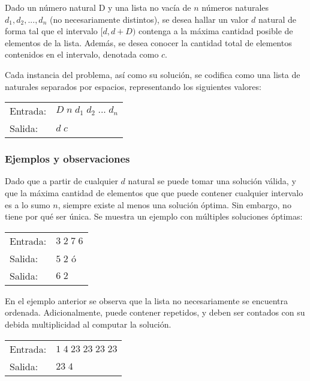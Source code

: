 Dado un número natural D y una lista no vacía de $n$ números naturales $d_1, d_2, ..., d_n$ (no necesariamente distintos), se desea hallar un valor $d$ natural de forma tal que el intervalo $[d, d + D)$ contenga a la máxima cantidad posible de elementos de la lista. Además, se desea conocer la cantidad total de elementos contenidos en el intervalo, denotada como $c$.

Cada instancia del problema, así como su solución, se codifica como una lista de naturales separados por espacios, representando los siguientes valores:

\begin{tabular}{ll}
Entrada: &$D\;n\;d_1\;d_2\;...\;d_n$ \\
Salida:  &$d\;c$
\end{tabular}

\subsubsection{Ejemplos y observaciones}

Dado que a partir de cualquier $d$ natural se puede tomar una solución válida, y que la máxima cantidad de elementos que que puede contener cualquier intervalo es a lo sumo $n$, siempre existe al menos una solución óptima. Sin embargo, no tiene por qué ser única. Se muestra un ejemplo con múltiples soluciones óptimas:

\begin{tabular}{ll}
Entrada: &$3\;2\;7\;6$            \\
Salida:  &$5\;2$ \hspace{10mm} ó  \\
Salida:  &$6\;2$ \hspace{10mm}
\end{tabular}

En el ejemplo anterior se observa que la lista no necesariamente se encuentra ordenada. Adicionalmente, puede contener repetidos, y deben ser contados con su debida multiplicidad al computar la solución.

\begin{tabular}{ll}
Entrada: &$1\;4\;23\;23\;23\;23$            \\
Salida:  &$23\;4$ \hspace{10mm}
\end{tabular}


